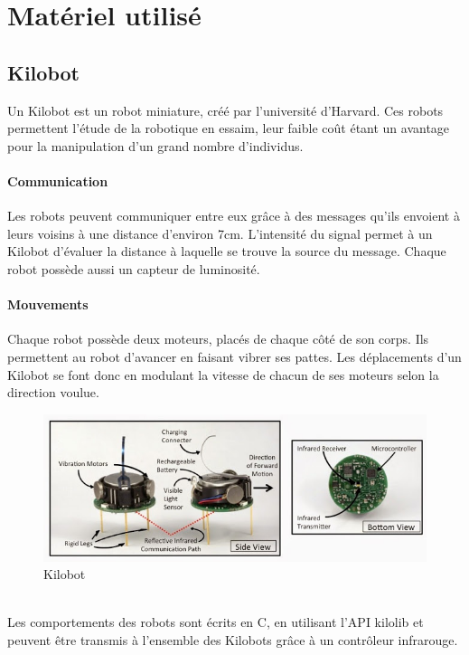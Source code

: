 \documentclass[a4paper]{article}
\begin{document}
\section{Matériel utilisé}
\subsection{Kilobot}
Un Kilobot \cite{rubenstein_kilobot:_2012} est un robot miniature, créé par l'université d'Harvard. Ces robots permettent l'étude de la robotique en essaim, leur faible coût étant un avantage pour la manipulation d'un grand nombre d'individus.
\paragraph{Communication}Les robots peuvent communiquer entre eux grâce à des messages qu'ils envoient à leurs voisins à une distance d'environ 7cm. L'intensité du signal permet à un Kilobot d'évaluer la distance à laquelle se trouve la source du message. Chaque robot possède aussi un capteur de luminosité.
\paragraph{Mouvements}Chaque robot possède deux moteurs, placés de chaque côté de son corps. Ils permettent au robot d'avancer en faisant vibrer ses pattes. Les déplacements d'un Kilobot se font donc en modulant la vitesse de chacun de ses moteurs selon la direction voulue.\\
\begin{figure}[h]
	\begin{center}
		\centering
		\includegraphics[width=0.8\linewidth]{incl/kilobot-closeup-overview.jpg}
		\caption{Kilobot}
	\end{center}
\end{figure} \\
Les comportements des robots sont écrits en C, en utilisant l'API kilolib et peuvent être transmis à l'ensemble des Kilobots  grâce à un contrôleur infrarouge.
\end{document}
